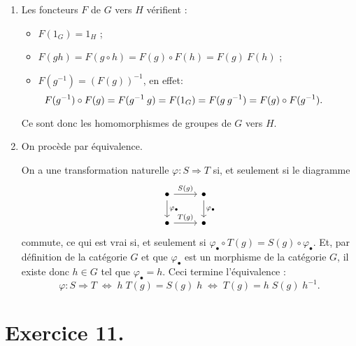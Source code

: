 \documentclass{../../td}
\begin{document}
  \begin{enumerate}
    \item Les foncteurs $F$ de $G$ vers $H$ vérifient :
      \begin{itemize}
        \item $F(1_G) = 1_H$ ;
        \item $F(gh) = F(g \circ h) = F(g) \circ F(h) = F(g)\:F(h)$ ;
        \item $F(g^{-1}) = (F(g))^{-1}$, en effet: \[
            \hspace{-1cm}
          F(g^{-1}) \circ F(g) = F(g^{-1}\:g) = F(1_G) = F(g \: g^{-1}) = F(g) \circ F(g^{-1}).
        \]
      \end{itemize}
      Ce sont donc les homomorphismes de groupes de $G$ vers $H$.
    \item On procède par équivalence.

      On a une transformation naturelle $\varphi : S \Rightarrow T$ si, et seulement si le diagramme 
      \[
      \begin{tikzcd}
        \bullet \arrow{r}{S(g)} \arrow{d}{\varphi_\bullet} &\bullet \arrow{d}{\varphi_\bullet}\\
        \bullet \arrow{r}{T(g)} & \bullet
      \end{tikzcd}
      \]
      commute, ce qui est vrai si, et seulement si $\varphi_\bullet \circ T(g) = S(g) \circ \varphi_\bullet$.
      Et, par définition de la catégorie $G$ et que $\varphi_\bullet$ est un morphisme de la catégorie $G$, il existe donc $h \in G$ tel que $\varphi_\bullet = h$.
      Ceci termine l'équivalence : \[
      \varphi : S \Rightarrow T \; \iff \; h\;T(g) = S(g)\;h \;\iff\; T(g) = h\;S(g)\;h^{-1}
      .\] 
  \end{enumerate}

  \chapter{Exercice 11.}
\end{document}
